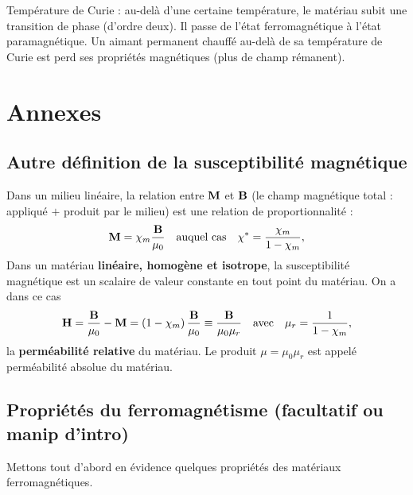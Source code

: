 \documentclass[11pt,a4paper]{report}
\begin{document}
Température de Curie : au-delà d'une certaine température, le matériau subit une transition de phase (d'ordre deux). Il passe de l'état ferromagnétique à l'état paramagnétique. Un aimant permanent chauffé au-delà de sa température de Curie est perd ses propriétés magnétiques (plus de champ rémanent).

\section*{Annexes}
\subsection*{Autre définition de la susceptibilité magnétique}

Dans un milieu linéaire, la relation entre $\bold{M}$ et $\bold{B}$ (le champ magnétique total : appliqué $+$ produit par le milieu) est une relation de proportionnalité :
\begin{equation}
	\bold{M} = \chi_m \frac{\bold{B}}{\mu_0} \quad\text{auquel cas}\quad
	\chi^* = \frac{\chi_m}{1-\chi_m},
\end{equation}
Dans un matériau \textbf{linéaire, homogène et isotrope}, la susceptibilité magnétique est un scalaire de valeur constante en tout point du matériau. On a dans ce cas
\begin{equation}
	\bold{H} = \frac{\bold{B}}{\mu_0} - \bold{M} = \left(1-\chi_m\right)\frac{\bold{B}}{\mu_0} \equiv \frac{\bold{B}}{\mu_0\mu_r}\quad\text{avec}\quad 	\mu_r = \frac{1}{1-\chi_m},
\end{equation}
la \textbf{perméabilité relative} du matériau. Le produit $\mu = \mu_0\mu_r$ est appelé perméabilité absolue du matériau.

\subsection*{Propriétés du ferromagnétisme (facultatif ou manip d'intro)}

Mettons tout d'abord en évidence quelques propriétés des matériaux ferromagnétiques.
\end{document}
